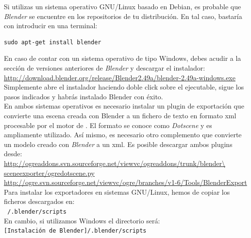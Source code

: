 \documentclass[a4paper,11pt]{article}
\begin{document}

Si utilizas un sistema operativo GNU/Linux basado en Debian, es probable
que \textit{Blender} se encuentre en los repositorios de tu distribución.
En tal caso, bastaría con introducir en una terminal:

\begin{lstlisting}[style=consola]
sudo apt-get install blender
\end{lstlisting}

En caso de contar con un sistema operativo de tipo Windows, debes acudir
a la sección de versiones anteriores de \textit{Blender} y descargar el
instalador:\\

\url{http://download.blender.org/release/Blender2.49a/blender-2.49a-windows.exe}\\

Simplemente abre el instalador haciendo doble click sobre el ejecutable,
sigue los pasos indicados y habrás instalado Blender con éxito.\\

En ambos sistemas operativos es necesario instalar un plugin de exportación
que convierte una escena creada con Blender a un fichero de texto en formato
xml procesable por el motor de \juego. El formato se conoce como \textit{Dotscene}
y es ampliamente utilizado. Así mismo, es necesario otro complemento que
convierte un modelo creado con \textit{Blender} a un xml. Es posible
descargar ambos plugins desde:\\

\url{http://ogreaddons.svn.sourceforge.net/viewvc/ogreaddons/trunk/blender\
sceneexporter/ogredotscene.py}\\

\url{http://ogre.svn.sourceforge.net/viewvc/ogre/branches/v1-6/Tools/BlenderExport}\\

Para instalar los exportadores en sistemas GNU/Linux, hemos de copiar los ficheros
descargados en:\\

\texttt{~/.blender/scripts}\\

En cambio, si utilizamos Windows el directorio será:\\

\texttt{[Instalación de Blender]/.blender/scripts}\\
\end{document}
